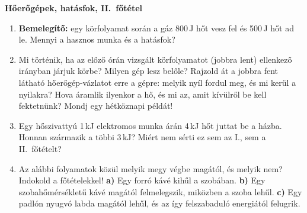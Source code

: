\documentclass[12pt]{article}
\begin{document}
\begin{center}
  {\Large\bfseries Hőerőgépek, hatásfok, II.~főtétel}\\[3pt]
\end{center}

\begin{minipage}[t]{0.70\linewidth}\vspace{0pt}
\begin{enumerate}
\item \textbf{Bemelegítő:} egy körfolyamat során a gáz 800\,J hőt vesz fel és 500\,J hőt
  ad le. Mennyi a hasznos munka és a hatásfok?

\item Mi történik, ha az előző órán vizsgált körfolyamatot (jobbra lent) ellenkező irányban
  járjuk körbe? Milyen gép lesz belőle? Rajzold át a jobbra fent látható hőerőgép-vázlatot
  erre a gépre: melyik nyíl fordul meg, és mi kerül a nyilakra? Hova áramlik ilyenkor a
  hő, és mi az, amit kívülről be kell fektetnünk? Mondj egy hétköznapi példát!

\item Egy hőszivattyú 1\,kJ elektromos munka árán 4\,kJ hőt juttat be a házba. Honnan
  származik a többi 3\,kJ? Miért nem sérti ez sem az I., sem a II.~főtételt?

\item Az alábbi folyamatok közül melyik megy végbe magától, és melyik nem? Indokold a
  főtételekkel!
  \textbf{a)} Egy forró kávé kihűl a szobában.
  \textbf{b)} Egy szobahőmérsékletű kávé magától felmelegszik, miközben a szoba lehűl.
  \textbf{c)} Egy padlón nyugvó labda magától lehűl, és az így felszabaduló energiától
  felugrik.
\end{enumerate}
\end{minipage}\hfill
\end{document}
